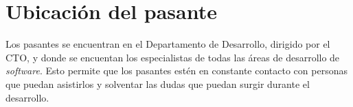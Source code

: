 \section{Ubicación del pasante} \label{Ubicacion del pasante}

Los pasantes se encuentran en el Departamento de Desarrollo, dirigido por el CTO, y donde se encuentan los especialistas de todas las áreas de desarrollo de \textit{software}. Esto permite que los pasantes estén en constante contacto con personas que puedan asistirlos y solventar las dudas que puedan surgir durante el desarrollo.

